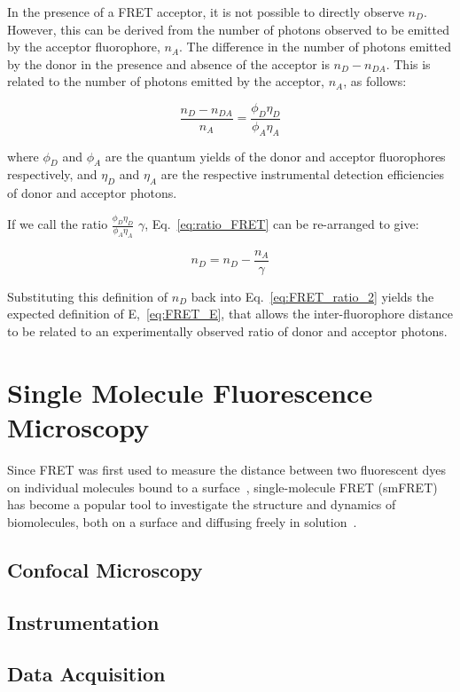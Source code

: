 In the presence of a FRET acceptor, it is not possible to directly observe $n_D$. However, this can be derived from the number of photons observed to be emitted by the acceptor fluorophore, $n_A$. The difference in the number of photons emitted by the donor in the presence and absence of the acceptor is $n_D - n_{DA}$. This is related to the number of photons emitted by the acceptor, $n_A$, as follows:

\begin{equation}
\frac{n_D - n_{DA}}{n_A} = \frac{\phi_D\eta_D}{\phi_A\eta_A}
\label{eq:ratio_FRET}
\end{equation}

where $\phi_D$ and $\phi_A$ are the quantum yields of the donor and acceptor fluorophores respectively, and $\eta_D$ and $\eta_A$ are the respective instrumental detection efficiencies of donor and acceptor photons.

If we call the ratio $\frac{\phi_D\eta_D}{\phi_A\eta_A}$ $\gamma$, Eq.~\ref{eq:ratio_FRET} can be re-arranged to give:

\begin{equation}
n_D = n_D - \frac{n_A}{\gamma}
\label{eq:get_gamma}
\end{equation}

Substituting this definition of $n_D$ back into Eq.~\ref{eq:FRET_ratio_2} yields the expected definition of E,~\ref{eq:FRET_E}, that allows the inter-fluorophore distance to be related to an experimentally observed ratio of donor and acceptor photons.

\section{Single Molecule Fluorescence Microscopy}
Since FRET was first used to measure the distance between two fluorescent dyes on individual molecules bound to a surface~\cite{ha96}, single-molecule FRET (smFRET) has become a popular tool to investigate the structure and dynamics of biomolecules, both on a surface and diffusing freely in solution~\cite{haran03, schuler02, weiss00}.

\subsection{Confocal Microscopy}
\subsection{Instrumentation}
\subsection{Data Acquisition}
